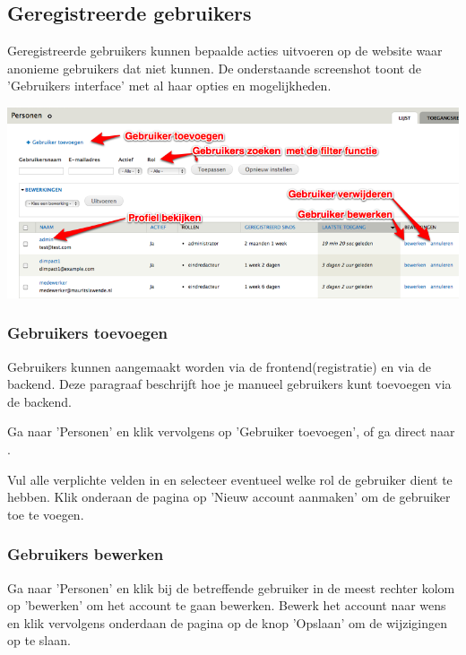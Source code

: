 \subsection{Geregistreerde gebruikers}\label{geregistreerdegebruikers}

Geregistreerde gebruikers kunnen bepaalde acties uitvoeren op de website waar anonieme gebruikers dat niet kunnen. 
De onderstaande screenshot toont de 'Gebruikers interface' met al haar opties en mogelijkheden.

\bigskip

\begin{center}
	\includegraphics[width=\textwidth]{img/gebruikers1.png}
\end{center}

\subsubsection{Gebruikers toevoegen}

Gebruikers kunnen aangemaakt worden via de frontend(registratie) en via de backend. Deze paragraaf beschrijft hoe je manueel gebruikers kunt toevoegen via de backend. 

Ga naar 'Personen' en klik vervolgens op 'Gebruiker toevoegen', of ga direct naar .

Vul alle verplichte velden in en selecteer eventueel welke rol de gebruiker dient te hebben.
Klik onderaan de pagina op 'Nieuw account aanmaken' om de gebruiker toe te voegen.

\subsubsection{Gebruikers bewerken}

Ga naar 'Personen' en klik bij de betreffende gebruiker in de meest rechter kolom op 'bewerken' om het account te gaan bewerken. 
Bewerk het account naar wens en klik vervolgens onderdaan de pagina op de knop 'Opslaan' om de wijzigingen op te slaan.


